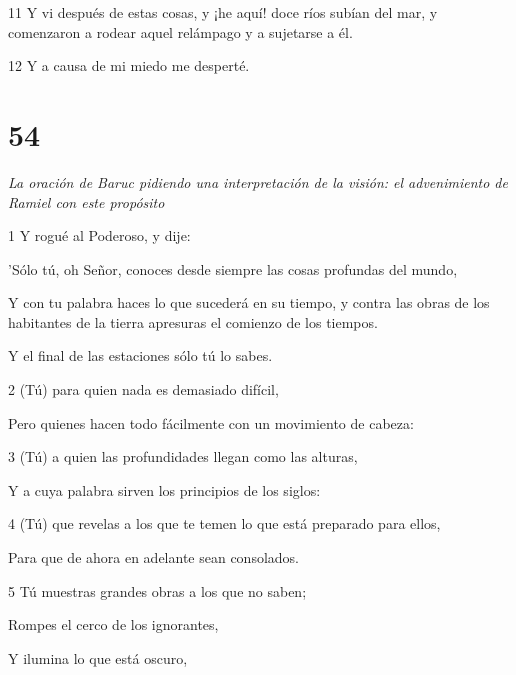\par 11 Y vi después de estas cosas, y ¡he aquí! doce ríos subían del mar, y comenzaron a rodear aquel relámpago y a sujetarse a él.

\par 12 Y a causa de mi miedo me desperté.

\chapter{54}

\par \textit{La oración de Baruc pidiendo una interpretación de la visión: el advenimiento de Ramiel con este propósito}


\par 1 Y rogué al Poderoso, y dije:

\par 'Sólo tú, oh Señor, conoces desde siempre las cosas profundas del mundo,

\par Y con tu palabra haces lo que sucederá en su tiempo, y contra las obras de los habitantes de la tierra apresuras el comienzo de los tiempos.

\par Y el final de las estaciones sólo tú lo sabes.

\par 2 (Tú) para quien nada es demasiado difícil,

\par Pero quienes hacen todo fácilmente con un movimiento de cabeza:

\par 3 (Tú) a quien las profundidades llegan como las alturas,

\par Y a cuya palabra sirven los principios de los siglos:

\par 4 (Tú) que revelas a los que te temen lo que está preparado para ellos,

\par Para que de ahora en adelante sean consolados.

\par 5 Tú muestras grandes obras a los que no saben;

\par Rompes el cerco de los ignorantes,

\par Y ilumina lo que está oscuro,

